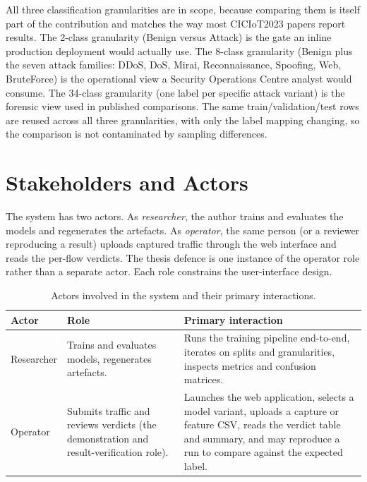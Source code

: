 \par All three classification granularities are in scope, because comparing them is itself part of the contribution and matches the way most CICIoT2023 papers report results. The 2-class granularity (Benign versus Attack) is the gate an inline production deployment would actually use. The 8-class granularity (Benign plus the seven attack families: DDoS, DoS, Mirai, Reconnaissance, Spoofing, Web, BruteForce) is the operational view a Security Operations Centre analyst would consume. The 34-class granularity (one label per specific attack variant) is the forensic view used in published comparisons. The same train/validation/test rows are reused across all three granularities, with only the label mapping changing, so the comparison is not contaminated by sampling differences.

\section{Stakeholders and Actors}
\label{sec:actors}

\par The system has two actors. As \emph{researcher}, the author trains and evaluates the models and regenerates the artefacts. As \emph{operator}, the same person (or a reviewer reproducing a result) uploads captured traffic through the web interface and reads the per-flow verdicts. The thesis defence is one instance of the operator role rather than a separate actor. Each role constrains the user-interface design.

\begin{table}[htbp]
\begin{center}
\begin{tabular}{|p{90pt}|p{90pt}|p{170pt}|}
\hline
\textbf{Actor} & \textbf{Role} & \textbf{Primary interaction} \\
\hline
\hline Researcher & Trains and evaluates models, regenerates artefacts. & Runs the training pipeline end-to-end, iterates on splits and granularities, inspects metrics and confusion matrices. \\
\hline Operator & Submits traffic and reviews verdicts (the demonstration and result-verification role). & Launches the web application, selects a model variant, uploads a capture or feature CSV, reads the verdict table and summary, and may reproduce a run to compare against the expected label. \\
\hline
\end{tabular}
\end{center}
\caption{Actors involved in the system and their primary interactions.}
\label{tab:actors}
\end{table}

